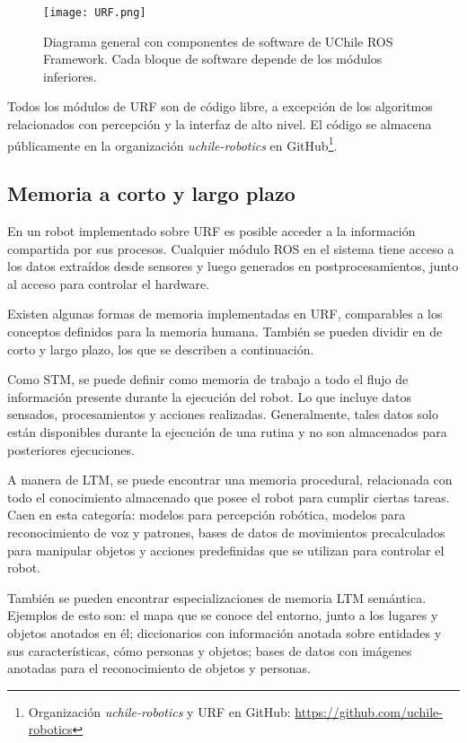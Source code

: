 \begin{figure}[!ht]
	\centering
	\texttt{[image: URF.png]}
	\caption[Componentes de UChile ROS Framework.]
	{\small Diagrama general con componentes de software de UChile ROS Framework. Cada bloque de software depende de los módulos inferiores.}
	\label{img:URF}
\end{figure}

Todos los módulos de URF son de código libre, a excepción de los algoritmos relacionados con percepción y la interfaz de alto nivel. El código se almacena públicamente en la organización \textit{uchile-robotics} en GitHub\footnote{Organización \textit{uchile-robotics} y URF en GitHub: \url{https://github.com/uchile-robotics}}.


\subsection{Memoria a corto y largo plazo}

En un robot implementado sobre URF es posible acceder a la información compartida por sus procesos. Cualquier módulo ROS en el sistema tiene acceso a los datos extraídos desde sensores y luego generados en postprocesamientos, junto al acceso para controlar el hardware.

Existen algunas formas de memoria implementadas en URF, comparables a los conceptos definidos para la memoria humana. También se pueden dividir en de corto y largo plazo, los que se describen a continuación.

Como STM, se puede definir como memoria de trabajo a todo el flujo de información presente durante la ejecución del robot. Lo que incluye datos sensados, procesamientos y acciones realizadas. Generalmente, tales datos solo están disponibles durante la ejecución de una rutina y no son almacenados para posteriores ejecuciones.

A manera de LTM, se puede encontrar una memoria procedural, relacionada con todo el conocimiento almacenado que posee el robot para cumplir ciertas tareas. Caen en esta categoría: modelos para percepción robótica, modelos para reconocimiento de voz y patrones, bases de datos de movimientos precalculados para manipular objetos y acciones predefinidas que se utilizan para controlar el robot.

También se pueden encontrar especializaciones de memoria LTM semántica. Ejemplos de esto son: el mapa que se conoce del entorno, junto a los lugares y objetos anotados en él; diccionarios con información anotada sobre entidades y sus características, cómo personas y objetos; bases de datos con imágenes anotadas para el reconocimiento de objetos y personas. 

